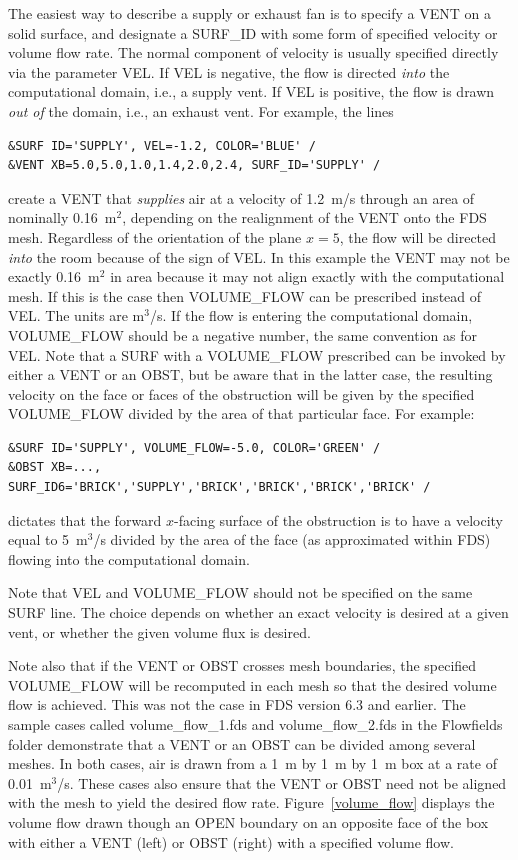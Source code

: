 \documentclass[11pt]{book}
\begin{document}
The easiest way to describe a supply or exhaust fan is to specify a {\ct VENT} on a solid surface, and designate a {\ct SURF\_ID} with some form of specified velocity or volume flow rate. The normal component of velocity is usually specified directly via the parameter {\ct VEL}. If {\ct VEL} is negative, the flow is directed {\em into} the computational domain, i.e., a supply vent. If {\ct VEL} is positive, the flow is drawn {\em out of} the domain, i.e., an exhaust vent. For example, the lines
\begin{lstlisting}
&SURF ID='SUPPLY', VEL=-1.2, COLOR='BLUE' /
&VENT XB=5.0,5.0,1.0,1.4,2.0,2.4, SURF_ID='SUPPLY' /
\end{lstlisting}
create a {\ct VENT} that {\em supplies} air at a velocity of 1.2~m/s through an area of nominally 0.16~m$^2$, depending on the realignment of the {\ct VENT} onto the FDS mesh. Regardless of the orientation of the plane $x=5$, the flow will be directed {\em into} the room because of the sign of {\ct VEL}. In this example the {\ct VENT} may not be exactly 0.16~m$^2$ in area because it may not align exactly with the computational mesh. If this is the case then {\ct VOLUME\_FLOW} can be prescribed instead of {\ct VEL}. The units are m$^3$/s. If the flow is entering the computational domain, {\ct VOLUME\_FLOW} should be a negative number, the same convention as for {\ct VEL}. Note that a {\ct SURF} with a {\ct VOLUME\_FLOW} prescribed can be invoked by either a {\ct VENT} or an {\ct OBST}, but be aware that in the latter case, the resulting velocity on the face or faces of the obstruction will be given by the specified {\ct VOLUME\_FLOW} divided by the area of that particular face. For example:
\begin{lstlisting}
&SURF ID='SUPPLY', VOLUME_FLOW=-5.0, COLOR='GREEN' /
&OBST XB=..., SURF_ID6='BRICK','SUPPLY','BRICK','BRICK','BRICK','BRICK' /
\end{lstlisting}
dictates that the forward $x$-facing surface of the obstruction is to have a velocity equal to 5~m$^3$/s divided by the area of the face (as approximated within FDS) flowing into the computational domain.

Note that {\ct VEL} and {\ct VOLUME\_FLOW} should not be specified on the same {\ct SURF} line.  The choice depends on whether an exact velocity is desired at a given vent, or whether the given volume flux is desired.

Note also that if the {\ct VENT} or {\ct OBST} crosses mesh boundaries, the specified {\ct VOLUME\_FLOW} will be recomputed in each mesh so that the desired volume flow is achieved. This was not the case in FDS version 6.3 and earlier. The sample cases called {\ct volume\_flow\_1.fds} and {\ct volume\_flow\_2.fds} in the {\ct Flowfields} folder demonstrate that a {\ct VENT} or an {\ct OBST} can be divided among several meshes. In both cases, air is drawn from a 1~m by 1~m by 1~m box at a rate of 0.01~m$^3$/s. These cases also ensure that the {\ct VENT} or {\ct OBST} need not be aligned with the mesh to yield the desired flow rate. Figure~\ref{volume_flow} displays the volume flow drawn though an {\ct OPEN} boundary on an opposite face of the box with either a {\ct VENT} (left) or {\ct OBST} (right) with a specified volume flow.
\end{document}
